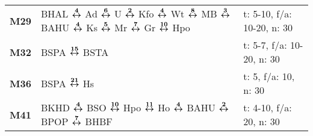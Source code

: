 \begin{minipage}[t]{0.45\textwidth}
\begin{tabular}{>{\bfseries}L{1.2cm}L{9.0cm}L{3.0cm}}
\mbus{} M29   & BHAL $\xarwe{4}$ Ad $\xarwe{6}$ U $\xarwe{2}$ Kfo $\xarwe{4}$ Wt $\xarwe{8}$ MB $\xarwe{3}$ BAHU $\xarwe{4}$ Ks $\xarwe{5}$ Mr $\xarwe{7}$ Gr $\xarwe{10}$ Hpo      & t: 5-10, f/a: 10-20, n: 30 \\
\mbus{} M32   & BSPA $\xarwe{15}$ BSTA                                                                                                                                              & t: 5-7, f/a: 10-20, n: 30  \\
\mbus{} M36   & BSPA $\xarwe{21}$ Hs & t: 5, f/a: 10, n: 30 \\
\mbus{} M41   & BKHD $\xarwe{4}$ BSO $\xarwe{10}$ Hpo $\xarwe{11}$ Ho $\xarwe{4}$ BAHU $\xarwe{2}$ BPOP $\xarwe{7}$ BHBF                                                            & t: 4-10, f/a: 20, n: 30    \\
\hline
\end{tabular}
\end{minipage}
\begin{minipage}[t]{0.05\textwidth}
\phantom{Tor}
\end{minipage}

